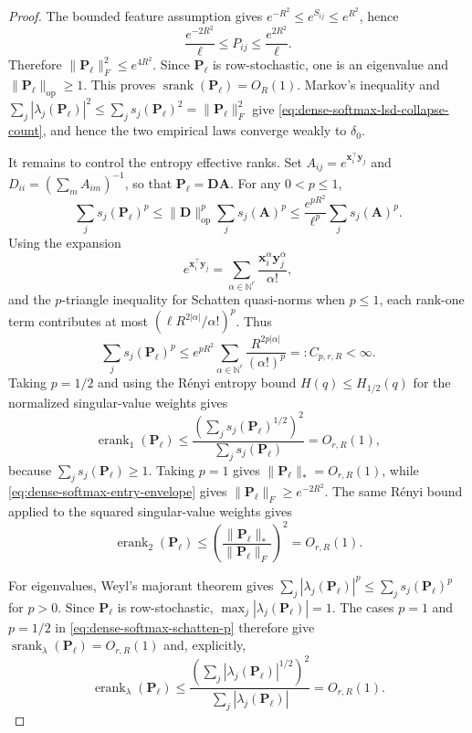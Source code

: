 \documentclass{article}
\newcommand{\srank}{\operatorname{srank}}
\newcommand{\erank}{\operatorname{erank}}
\newcommand{\op}{\operatorname{op}}
\newcommand{\bA}{\mathbf{A}}
\newcommand{\bD}{\mathbf{D}}
\newcommand{\bP}{\mathbf{P}}
\theoremstyle{definition}
\theoremstyle{remark}
\begin{document}
\begin{proof}
The bounded feature assumption gives
$e^{-R^2}\leq e^{S_{ij}}\leq e^{R^2}$, hence
\begin{equation}
    \frac{e^{-2R^2}}{\ell}
    \leq
    P_{ij}
    \leq
    \frac{e^{2R^2}}{\ell}.
    \label{eq:dense-softmax-entry-envelope}
\end{equation}
Therefore $\|\bP_\ell\|_F^2\leq e^{4R^2}$.  Since $\bP_\ell$ is row-stochastic,
one is an eigenvalue and $\|\bP_\ell\|_{\op}\geq1$.  This proves
$\srank(\bP_\ell)=O_R(1)$.  Markov's inequality and
$\sum_j|\lambda_j(\bP_\ell)|^2\leq\sum_js_j(\bP_\ell)^2=\|\bP_\ell\|_F^2$
give \eqref{eq:dense-softmax-lsd-collapse-count}, and hence the two empirical
laws converge weakly to $\delta_0$.

It remains to control the entropy effective ranks.  Set
$A_{ij}=e^{\mathbf x_i^\top\mathbf y_j}$ and
$D_{ii}=(\sum_mA_{im})^{-1}$, so that $\bP_\ell=\bD\bA$.  For any
$0<p\leq1$,
\[
    \sum_j s_j(\bP_\ell)^p
    \leq
    \|\bD\|_{\op}^p\sum_j s_j(\bA)^p
    \leq
    \frac{e^{pR^2}}{\ell^p}\sum_j s_j(\bA)^p.
\]
Using the expansion
\[
    e^{\mathbf x_i^\top\mathbf y_j}
    =
    \sum_{\alpha\in\mathbb N^r}
    \frac{\mathbf x_i^\alpha\mathbf y_j^\alpha}{\alpha!},
\]
and the $p$-triangle inequality for Schatten quasi-norms when $p\leq1$, each
rank-one term contributes at most
$(\ell R^{2|\alpha|}/\alpha!)^p$.  Thus
\begin{equation}
    \sum_j s_j(\bP_\ell)^p
    \leq
    e^{pR^2}
    \sum_{\alpha\in\mathbb N^r}
    \frac{R^{2p|\alpha|}}{(\alpha!)^p}
    =:C_{p,r,R}<\infty.
    \label{eq:dense-softmax-schatten-p}
\end{equation}
Taking $p=1/2$ and using the R\'enyi entropy bound
$H(q)\leq H_{1/2}(q)$ for the normalized singular-value weights gives
\[
    \erank_1(\bP_\ell)
    \leq
    \frac{\left(\sum_j s_j(\bP_\ell)^{1/2}\right)^2}
    {\sum_j s_j(\bP_\ell)}
    =O_{r,R}(1),
\]
because $\sum_js_j(\bP_\ell)\geq1$.  Taking $p=1$ gives
$\|\bP_\ell\|_*=O_{r,R}(1)$, while
\eqref{eq:dense-softmax-entry-envelope} gives $\|\bP_\ell\|_F\geq e^{-2R^2}$.
The same R\'enyi bound applied to the squared singular-value weights gives
\[
    \erank_2(\bP_\ell)
    \leq
    \left(\frac{\|\bP_\ell\|_*}{\|\bP_\ell\|_F}\right)^2
    =O_{r,R}(1).
\]

For eigenvalues, Weyl's majorant theorem gives
$\sum_j|\lambda_j(\bP_\ell)|^p\leq\sum_js_j(\bP_\ell)^p$ for $p>0$.  Since
$\bP_\ell$ is row-stochastic, $\max_j|\lambda_j(\bP_\ell)|=1$.  The cases
$p=1$ and $p=1/2$ in \eqref{eq:dense-softmax-schatten-p} therefore give
$\srank_\lambda(\bP_\ell)=O_{r,R}(1)$ and, explicitly,
\[
    \erank_\lambda(\bP_\ell)
    \leq
    \frac{\left(\sum_j|\lambda_j(\bP_\ell)|^{1/2}\right)^2}
    {\sum_j|\lambda_j(\bP_\ell)|}
    =O_{r,R}(1).
\]
\end{proof}
\end{document}
